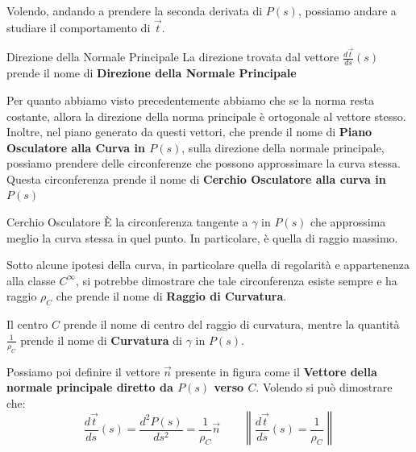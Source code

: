 \documentclass[11pt,a4paper,twoside]{article}
\theoremstyle{definition}
\begin{document}
Volendo, andando a prendere la seconda derivata di $P(s)$, possiamo andare a studiare il comportamento di $\vec t$.

\begin{defn}{Direzione della Normale Principale}{}
	La direzione trovata dal vettore $\frac{d\vec t}{ds}(s)$ prende il nome di \textbf{Direzione della Normale Principale}
\end{defn}

Per quanto abbiamo visto precedentemente abbiamo che se la norma resta costante, allora la direzione della norma principale è ortogonale al vettore stesso.\\
Inoltre, nel piano generato da questi vettori, che prende il nome di \textbf{Piano Osculatore alla Curva in $P(s)$}, sulla direzione della normale principale, possiamo prendere delle circonferenze che possono approssimare la curva stessa. Questa circonferenza prende il nome di \textbf{Cerchio Osculatore alla curva in $P(s)$}

\begin{defn}{Cerchio Osculatore}{}
	È la circonferenza tangente a $\gamma$ in $P(s)$ che approssima meglio la curva stessa in quel punto. In particolare, è quella di raggio massimo.
\end{defn}

Sotto alcune ipotesi della curva, in particolare quella di regolarità e appartenenza alla classe $C^\infty$, si potrebbe dimostrare che tale circonferenza esiste sempre e ha raggio $\rho_C$ che prende il nome di \textbf{Raggio di Curvatura}.

\begin{center}
\end{center}

Il centro $C$ prende il nome di centro del raggio di curvatura, mentre la quantità $\frac 1{\rho_C}$ prende il nome di \textbf{Curvatura} di $\gamma$ in $P(s)$.

Possiamo poi definire il vettore $\vec n$ presente in figura come il \textbf{Vettore della normale principale diretto da $P(s)$ verso $C$}. Volendo si può dimostrare che:
\[\frac{d \vec t}{ds}(s) = \frac{d^2 P(s)}{ds^2} = \frac 1{\rho_C} \vec n\qquad \left\| \frac{d \vec t}{ds}(s) = \frac 1{\rho_C} \right\|\]
\end{document}
